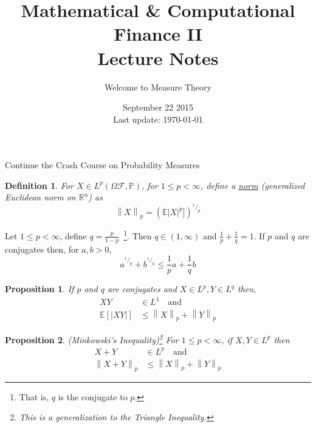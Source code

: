 \documentclass[12pt]{article}
\newtheorem{definition}{Definition}
\newtheorem{proposition}{Proposition}
\newcommand\norm[1]{\left\lVert#1\right\rVert} %
\begin{document}
 
 
\title{Mathematical \& Computational Finance II\\Lecture Notes}
\author{Welcome to Measure Theory}
\date{September 22 2015 \\ Last update: \today{}}
\maketitle

\begin{section}{Continue the Crash Course on Probability Measures}

\begin{definition} \label{def:norm} For $X \in L^p(\Omega \mathcal F, \mathbb P)$, for $1 \leq p < \infty$, define a \underline{norm} (generalized Euclidean norm on $\mathbb R^n$) as
\begin{equation*}
	\norm{X}_p = (\mathbb E|X|^p])^{^1/_p}
\end{equation*}
\end{definition}

\noindent Let $1 \leq p < \infty$, define $q = \frac{p}{1-p}$~\footnote{That is, $q$ is the conjugate to $p$.}. Then $q \in (1, \infty)$ and $\frac{1}{p} + \frac{1}{q} = 1$. If $p$ and $q$ are conjugates then, for $a, b > 0$,
\begin{equation*}
	a^{^1/_p} + b^{^1/_q} \leq \frac{1}{p}a + \frac{1}{q}b
\end{equation*}

\begin{proposition} If $p$ and $q$ are conjugates and $X \in L^p, Y \in L^q$ then,
\begin{align*}
	XY &\in L^1 \quad \text{and} \\
	\mathbb E[|XY|] &\leq \norm{X}_p + \norm{Y}_p
\end{align*}
\end{proposition}

\begin{proposition} (Minkowski's Inequality)\footnote{This is a generalization to the Triangle Inequality.} For $1 \leq p < \infty$, if $X, Y \in L^p$ then
\begin{align*}
	X + Y& \in L^p \quad \text{and} \\
	\norm{X + Y}_p &\leq \norm{X}_p + \norm{Y}_p
\end{align*}
\end{proposition}


\end{section}
\end{document}
